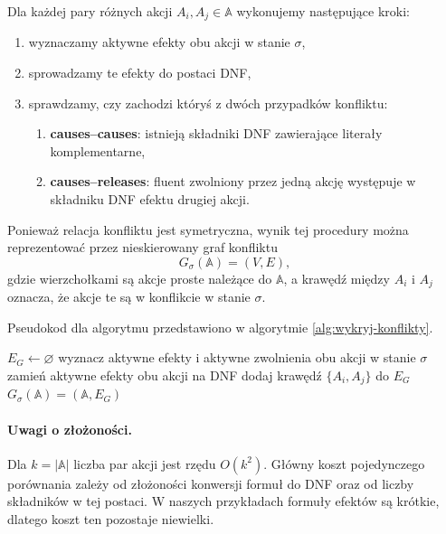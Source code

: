 \documentclass[11pt,a4paper]{article}
\theoremstyle{definition}
\begin{document}
Dla każdej pary różnych akcji $A_i, A_j \in \mathbb{A}$ wykonujemy następujące kroki:
\begin{enumerate}
    \item wyznaczamy aktywne efekty obu akcji w stanie $\sigma$,
    \item sprowadzamy te efekty do postaci DNF,
    \item sprawdzamy, czy zachodzi któryś z dwóch przypadków konfliktu:
    \begin{enumerate}
        \item \textbf{causes--causes}: istnieją składniki DNF zawierające literały komplementarne,
        \item \textbf{causes--releases}: fluent zwolniony przez jedną akcję występuje w składniku DNF efektu drugiej akcji.
    \end{enumerate}
\end{enumerate}

Ponieważ relacja konfliktu jest symetryczna, wynik tej procedury można reprezentować przez nieskierowany graf konfliktu
\[
G_{\sigma}(\mathbb{A}) = (V,E),
\]
gdzie wierzchołkami są akcje proste należące do $\mathbb{A}$, a krawędź między $A_i$ i $A_j$ oznacza, że akcje te są w konflikcie w stanie $\sigma$.

Pseudokod dla algorytmu przedstawiono w algorytmie \ref{alg:wykryj-konflikty}.

\begin{algorithm}[H]
\caption{Pseudokod dla algorytmu wykrywającego konflikty}
\label{alg:wykryj-konflikty}
\begin{algorithmic}[1]
        \State $E_G \leftarrow \varnothing$
            \State wyznacz aktywne efekty i aktywne zwolnienia obu akcji w stanie $\sigma$
            \State zamień aktywne efekty obu akcji na DNF
                \State dodaj krawędź $\{A_i,A_j\}$ do $E_G$
            \EndIf
        \EndFor
        \Return $G_{\sigma}(\mathbb{A}) = (\mathbb{A}, E_G)$
    \EndProcedure
\end{algorithmic}
\end{algorithm}

\paragraph{Uwagi o złożoności.}
Dla $k=|\mathbb{A}|$ liczba par akcji jest rzędu $O(k^2)$. Główny koszt pojedynczego porównania zależy od złożoności konwersji formuł do DNF oraz od liczby składników w tej postaci. W naszych przykładach formuły efektów są krótkie, dlatego koszt ten pozostaje niewielki.
\end{document}
